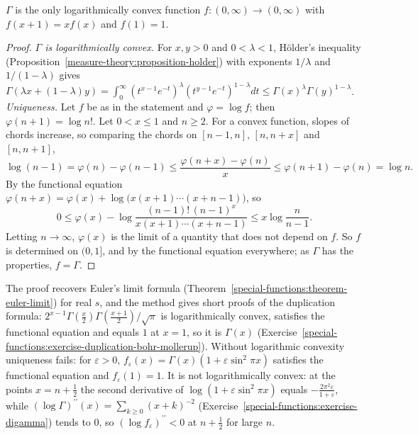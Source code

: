 \begin{theorem}\label{special-functions:theorem-bohr-mollerup}
$\Gamma$ is the only logarithmically convex function $f \colon (0, \infty) \to (0, \infty)$ with $f(x + 1) = xf(x)$ and $f(1) = 1$.
\end{theorem}

\begin{proof}
\emph{$\Gamma$ is logarithmically convex.} For $x, y > 0$ and $0 < \lambda < 1$, H\"older's inequality (Proposition~\ref{measure-theory:proposition-holder}) with exponents $1/\lambda$ and $1/(1 - \lambda)$ gives
$\Gamma(\lambda x + (1 - \lambda)y) = \int_0^\infty(t^{x-1}e^{-t})^\lambda(t^{y-1}e^{-t})^{1-\lambda}dt \leq \Gamma(x)^\lambda\Gamma(y)^{1-\lambda}$.
\emph{Uniqueness.} Let $f$ be as in the statement and $\varphi = \log f$; then $\varphi(n + 1) = \log n!$. Let $0 < x \leq 1$ and $n \geq 2$. For a convex function, slopes of chords increase, so comparing the chords on
$[n - 1, n]$, $[n, n + x]$ and $[n, n + 1]$,
\[
\log(n - 1) = \varphi(n) - \varphi(n - 1) \leq \frac{\varphi(n + x) - \varphi(n)}{x} \leq \varphi(n + 1) - \varphi(n) = \log n.
\]
By the functional equation $\varphi(n + x) = \varphi(x) + \log\bigl(x(x + 1)\cdots(x + n - 1)\bigr)$, so
\[
0 \leq \varphi(x) - \log\frac{(n - 1)!\,(n - 1)^x}{x(x + 1)\cdots(x + n - 1)} \leq x\log\frac{n}{n - 1}.
\]
Letting $n \to \infty$, $\varphi(x)$ is the limit of a quantity that does not depend on $f$. So $f$ is determined on $(0, 1]$, and by the functional equation everywhere; as $\Gamma$ has the properties, $f = \Gamma$.
\end{proof}

\begin{remark}\label{special-functions:remark-bohr-mollerup}
The proof recovers Euler's limit formula (Theorem~\ref{special-functions:theorem-euler-limit}) for real $s$, and the method gives short proofs of the duplication formula: $2^{x-1}\Gamma(\frac x2)\Gamma(\frac{x+1}2)/\sqrt{\pi}$ is
logarithmically convex, satisfies the functional equation and equals $1$ at $x = 1$, so it is $\Gamma(x)$ (Exercise~\ref{special-functions:exercise-duplication-bohr-mollerup}). Without logarithmic convexity uniqueness fails: for $\varepsilon > 0$,
$f_\varepsilon(x) = \Gamma(x)(1 + \varepsilon\sin^2\pi x)$ satisfies the functional equation and $f_\varepsilon(1) = 1$. It is not logarithmically convex: at the points $x = n + \frac12$ the second derivative of
$\log(1 + \varepsilon\sin^2\pi x)$ equals $-\frac{2\pi^2\varepsilon}{1 + \varepsilon}$, while $(\log\Gamma)^{\prime\prime}(x) = \sum_{k \geq 0}(x + k)^{-2}$ (Exercise~\ref{special-functions:exercise-digamma}) tends to $0$, so
$(\log f_\varepsilon)^{\prime\prime} < 0$ at $n + \frac12$ for large $n$.
\end{remark}


